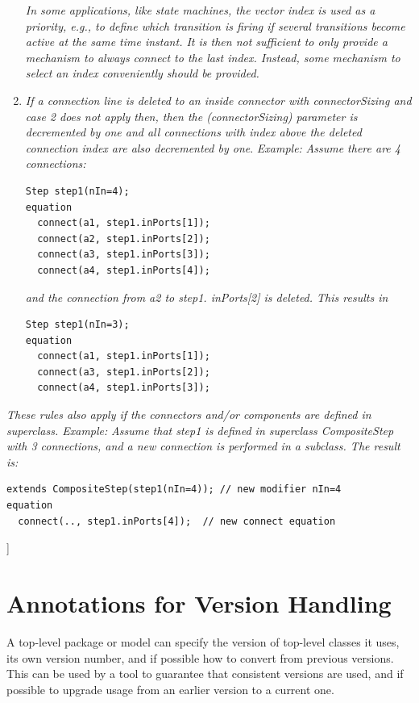 \documentclass[10pt,a4paper]{report}
\def\doublelabel#1{\label{#1}}
\begin{document}
\begin{enumerate}
  \emph{In some applications, like state machines, the vector index is
  used as a priority, e.g., to define which transition is firing if
  several transitions become active at the same time instant. It is then
  not sufficient to only provide a mechanism to always connect to the
  last index. Instead, some mechanism to select an index conveniently
  should be provided. }
\item
  \emph{If a connection line is deleted to an inside connector with
  connectorSizing and case 2 does not apply then, then the
  (connectorSizing) parameter is decremented by one and all connections
  with index above the deleted connection index are also decremented by
  one}. \emph{Example:} \emph{Assume there are 4 connections:}
\begin{lstlisting}[language=modelica]
  Step step1(nIn=4);
equation
  connect(a1, step1.inPorts[1]);
  connect(a2, step1.inPorts[2]);
  connect(a3, step1.inPorts[3]);
  connect(a4, step1.inPorts[4]);
\end{lstlisting}
  \emph{and the connection from a2 to step1. inPorts{[}2{]} is deleted.
  This results in} 
\begin{lstlisting}[language=modelica]
  Step step1(nIn=3);
equation
  connect(a1, step1.inPorts[1]);
  connect(a3, step1.inPorts[2]);
  connect(a4, step1.inPorts[3]);
\end{lstlisting}
\end{enumerate}

\emph{These rules also apply if the connectors and/or components are
defined in {superclass}. Example:} \emph{Assume that step1 is defined in
superclass CompositeStep with 3 connections, and a new connection is
performed in a subclass. The result is:}
\begin{lstlisting}[language=modelica]
  extends CompositeStep(step1(nIn=4)); // new modifier nIn=4
equation
  connect(.., step1.inPorts[4]);  // new connect equation 
\end{lstlisting}
{]}

\section{Annotations for Version Handling}\doublelabel{annotations-for-version-handling}

A top-level package or model can specify the version of top-level
classes it uses, its own version number, and if possible how to convert
from previous versions. This can be used by a tool to guarantee that
consistent versions are used, and if possible to upgrade usage from an
earlier version to a current one.
\end{document}
